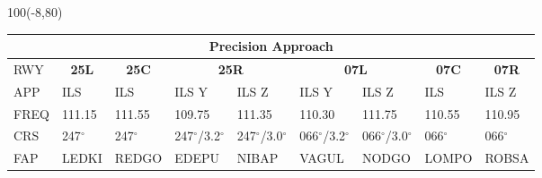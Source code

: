 \documentclass[10pt,landscape,a4paper]{article}
\begin{document}
\begin{textblock}{100}(-8,80)
  \begin{table}[]
    \begin{tabular}{|l|l|l|l|l|l|l|l|l|}
      \multicolumn{9}{c}{\textbf{Precision Approach}}                                                                                                                                                                                                          \\ \hline
      RWY  & \multicolumn{1}{c|}{\textbf{25L}} & \multicolumn{1}{c|}{\textbf{25C}} & \multicolumn{2}{c|}{\textbf{25R}} & \multicolumn{2}{c|}{\textbf{07L}} & \multicolumn{1}{c|}{\textbf{07C}} & \multicolumn{1}{c|}{\textbf{07R}}                             \\ \hline
      APP  & ILS                               & ILS                               & ILS Y                             & ILS Z                             & ILS Y                             & ILS Z                             & ILS         & ILS Z       \\
      FREQ & 111.15                            & 111.55                            & 109.75                            & 111.35                            & 110.30                            & 111.75                            & 110.55      & 110.95      \\
      CRS  & 247$^\circ$                       & 247$^\circ$                       & 247$^\circ$/3.2$^\circ$           & 247$^\circ$/3.0$^\circ$           & 066$^\circ$/3.2$^\circ$           & 066$^\circ$/3.0$^\circ$           & 066$^\circ$ & 066$^\circ$ \\
      FAP  & LEDKI                             & REDGO                             & EDEPU                             & NIBAP                             & VAGUL                             & NODGO                             & LOMPO       & ROBSA       \\ \hline
    \end{tabular}
  \end{table}
\end{textblock}
\end{document}

